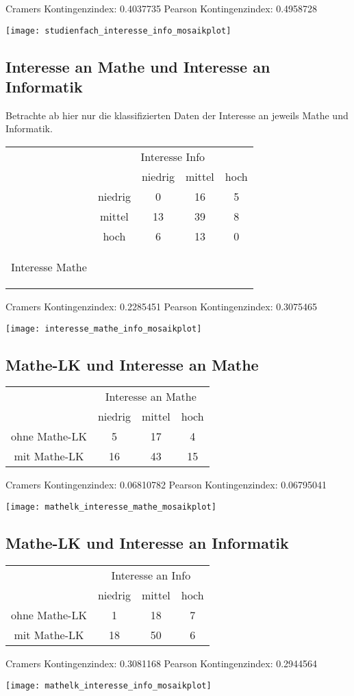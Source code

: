 \documentclass[paper=a4,                 %
               fontsize=12pt,            %
               parskip=half,             %
               ngerman,                 %
               ]{scrartcl}
\begin{document}
Cramers Kontingenzindex:  0.4037735 \newline
Pearson Kontingenzindex:  0.4958728 

\texttt{[image: studienfach\_interesse\_info\_mosaikplot]}

\subsection{Interesse an Mathe und Interesse an Informatik}
Betrachte ab hier nur die klassifizierten Daten der Interesse an jeweils Mathe und Informatik. \\ \newline
\begin{tabular}{cc|c|c|c}
& \multicolumn{4}{c}{Interesse Info} \\
& & niedrig & mittel & hoch \\
& niedrig      & 0   &  16 &   5\\
&  mittel      & 13  &   39  &  8\\
&  hoch    &   6 &    13 &   0\\
 \begin{rotate}{90} Interesse Mathe \end{rotate}&&&&
\end{tabular}

Cramers Kontingenzindex:  0.2285451 \newline
Pearson Kontingenzindex:  0.3075465

\texttt{[image: interesse\_mathe\_info\_mosaikplot]}

\subsection{Mathe-LK und Interesse an Mathe}
\begin{tabular}{c|c|c|c}
&  \multicolumn{3}{c}{Interesse an Mathe}   \\
&  niedrig & mittel & hoch\\
\hline
ohne Mathe-LK & 5  & 17 & 4  \\
 mit Mathe-LK &16 & 43 &15  \\
\end{tabular}

Cramers Kontingenzindex:  0.06810782 \newline
Pearson Kontingenzindex:  0.06795041

\texttt{[image: mathelk\_interesse\_mathe\_mosaikplot]}

\newpage
\subsection{Mathe-LK und Interesse an Informatik}
\begin{tabular}{c|c|c|c}
&  \multicolumn{3}{c}{Interesse an Info}    \\
&  niedrig & mittel & hoch\\
\hline
 ohne Mathe-LK & 1 & 18 & 7\\
 mit Mathe-LK & 18 & 50 & 6\\
\end{tabular}

Cramers Kontingenzindex:  0.3081168 \newline
Pearson Kontingenzindex:  0.2944564 

\texttt{[image: mathelk\_interesse\_info\_mosaikplot]}
\end{document}
